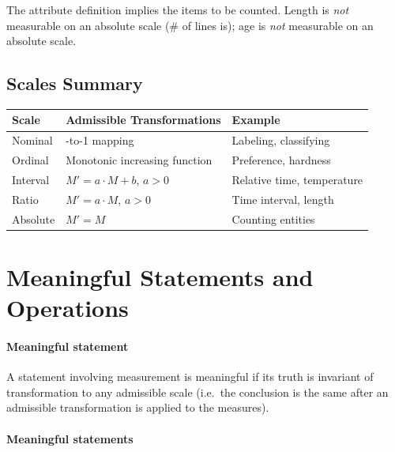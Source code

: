 The attribute definition implies the items to be counted. Length is \emph{not} measurable on an
absolute scale (\# of lines is); age is \emph{not} measurable on an absolute scale.

\subsection{Scales Summary}

\begin{table}[h!]
  \renewcommand{\arraystretch}{1.4}
  \centering
  \begin{tabularx}{\textwidth}{>{\raggedright\arraybackslash}X >{\raggedright\arraybackslash}X >{\raggedright\arraybackslash}X}
    \toprule
    \textbf{Scale} & \textbf{Admissible Transformations} & \textbf{Example}           \\
    \midrule
    Nominal        & 1-to-1 mapping                      & Labeling, classifying      \\
    Ordinal        & Monotonic increasing function       & Preference, hardness       \\
    Interval       & $M' = a \cdot M + b$, $a > 0$       & Relative time, temperature \\
    Ratio          & $M' = a \cdot M$, $a > 0$           & Time interval, length      \\
    Absolute       & $M' = M$                            & Counting entities          \\
    \bottomrule
  \end{tabularx}
\end{table}

\section{Meaningful Statements and Operations}

\paragraph{Meaningful statement}
A statement involving measurement is meaningful if its truth is invariant of transformation
to any admissible scale (i.e.\ the conclusion is the same after an admissible transformation
is applied to the measures).

\paragraph{Meaningful statements}

